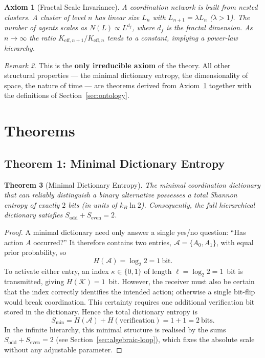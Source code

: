 \documentclass[12pt,a4paper]{article}
\newtheorem{theorem}{Theorem}[section]
\newtheorem{axiom}[theorem]{Axiom}
\theoremstyle{remark}
\newtheorem{remark}[theorem]{Remark}
\begin{document}
	\begin{axiom}[Fractal Scale Invariance]
		\label{ax:A1}
		A coordination network is built from nested clusters.  A cluster of level
		\(n\) has linear size \(L_n\) with \(L_{n+1} = \lambda L_n\) (\(\lambda > 1\)).
		The number of agents scales as \(N(L) \propto L^{d_f}\), where \(d_f\) is the
		fractal dimension.  As \(n \to \infty\) the ratio
		\(K_{\mathrm{eff},n+1}/K_{\mathrm{eff},n}\) tends to a constant, implying
		a power-law hierarchy.
	\end{axiom}
	
	\begin{remark}
		This is the \textbf{only irreducible axiom} of the theory.  All other
		structural properties --- the minimal dictionary entropy, the dimensionality
		of space, the nature of time --- are theorems derived from Axiom~\ref{ax:A1}
		together with the definitions of Section~\ref{sec:ontology}.
	\end{remark}
	
	\section{Theorems}
	\label{sec:theorems}
	
	\subsection{Theorem 1: Minimal Dictionary Entropy}
	
	\begin{theorem}[Minimal Dictionary Entropy]
		\label{thm:minimal-dict}
		The minimal coordination dictionary that can reliably distinguish a binary
		alternative possesses a total Shannon entropy of exactly \(2\) bits (in
		units of \(k_B\ln 2\)).  Consequently, the full hierarchical dictionary
		satisfies \(S_{\mathrm{odd}} + S_{\mathrm{even}} = 2\).
	\end{theorem}
	
	\begin{proof}
		A minimal dictionary need only answer a single yes/no question: ``Has
		action \(A\) occurred?''  It therefore contains two entries,
		\(\mathcal{A} = \{A_0, A_1\}\), with equal prior probability, so
		\[
		H(\mathcal{A}) = \log_2 2 = 1\ \text{bit}.
		\]
		To activate either entry, an index \(\kappa \in \{0,1\}\) of length
		\(\ell = \log_2 2 = 1\)~bit is transmitted, giving \(H(\mathcal{K}) = 1\)~bit.
		However, the receiver must also be certain that the index correctly
		identifies the intended action; otherwise a single bit-flip would break
		coordination.  This certainty requires one additional verification bit
		stored in the dictionary.  Hence the total dictionary entropy is
		\[
		S_{\min} = H(\mathcal{A}) + H(\text{verification}) = 1 + 1 = 2\ \text{bits}.
		\]
		In the infinite hierarchy, this minimal structure is realised by the sums
		\(S_{\mathrm{odd}} + S_{\mathrm{even}} = 2\) (see Section~\ref{sec:algebraic-loop}),
		which fixes the absolute scale without any adjustable parameter.
	\end{proof}
	
\end{document}
